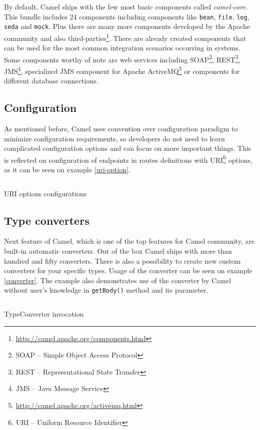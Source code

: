 \documentclass[12pt,final,oneside]{fithesis2}
\begin{document}
By default, Camel ships with the few most basic components called \textit{camel-core}. This bundle includes 24 components including components like \texttt{bean}, \texttt{file}, \texttt{log}, \texttt{seda} and \texttt{mock}. Plus there are many more components developed by the Apache community and also third-parties\footnote{\url{http://camel.apache.org/components.html}}. There are already created components that can be used for the most common integration scenarios occurring in systems. Some components worthy of note are web services including SOAP\footnote{SOAP -- Simple Object Access Protocol}, REST\footnote{REST -- Representational State Transfer}, JMS\footnote{JMS -- Java Message Service}, specialized JMS component for Apache ActiveMQ\footnote{\url{http://camel.apache.org/activemq.html}} or components for different database connections.


\subsection*{Configuration}
As mentioned before, Camel uses convention over configuration paradigm to minimize configuration requirements, so developers do not need to learn complicated configuration options and can focus on more important things. This is reflected on configuration of endpoints in routes definitions with URI\footnote{URI -- Uniform Resource Identifier} options, as it can be seen on example \ref{uri-option}.
\begin{listing}[ht]
	\inputminted[]{java}{sources/uri.java}
	\caption{URI options configurations}
	\label{uri-option}
\end{listing}

\subsection*{Type converters}
Next feature of Camel, which is one of the top features for Camel community, are built-in automatic converters. Out of the box Camel ships with more than hundred and fifty converters\cite{camel-in-action}. There is also a possibility to create new custom converters for your specific types. Usage of the converter can be seen on example \ref{converter}. The example also demonstrates use of the converter by Camel without user's knowledge in \texttt{getBody()} method and its parameter.

\begin{listing}[ht, p!]
	\inputminted[]{java}{sources/converter.java}
	\caption{TypeConverter invocation}
	\label{converter}
\end{listing}
\end{document}
